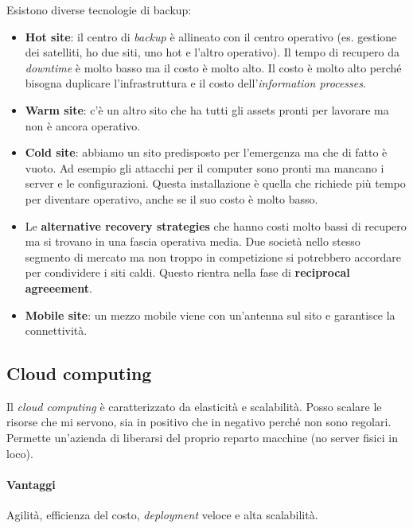 Esistono diverse tecnologie di backup:
\begin{itemize}
  \item \textbf{Hot site}: il centro di \textit{backup} è allineato con il
  centro operativo (es. gestione dei satelliti, ho due siti, uno hot e l'altro
  operativo). Il tempo di recupero da \textit{downtime} è molto basso ma il
  costo è molto alto. Il costo è molto alto perché bisogna duplicare
  l'infrastruttura e il costo dell'\textit{information processes}.

  \item \textbf{Warm site}: c'è un altro sito che ha tutti gli assets pronti
  per lavorare ma non è ancora operativo.

  \item \textbf{Cold site}: abbiamo un sito predisposto per l'emergenza ma che
  di fatto è vuoto. Ad esempio gli attacchi per il computer sono pronti ma
  mancano i server e le configurazioni. Questa installazione è quella che
  richiede più tempo per diventare operativo, anche se il suo costo è molto
  basso.

  \item Le \textbf{alternative recovery strategies} che hanno costi molto bassi
  di recupero ma si trovano in una fascia operativa media. Due società nello
  stesso segmento di mercato ma non troppo in competizione si potrebbero
  accordare per condividere i siti caldi. Questo rientra nella fase di
  \textbf{reciprocal agreeement}.


  \item \textbf{Mobile site}: un mezzo mobile viene con un'antenna sul sito e
  garantisce la connettività.

\end{itemize}


\subsection{Cloud computing}

Il \textit{cloud computing} è caratterizzato da elasticità e scalabilità. Posso
scalare le risorse che mi servono, sia in positivo che in negativo perché non
sono regolari. Permette un'azienda di liberarsi del proprio reparto macchine
(no server fisici in loco).

\paragraph*{Vantaggi} Agilità, efficienza del costo, \textit{deployment} veloce
e alta scalabilità.

